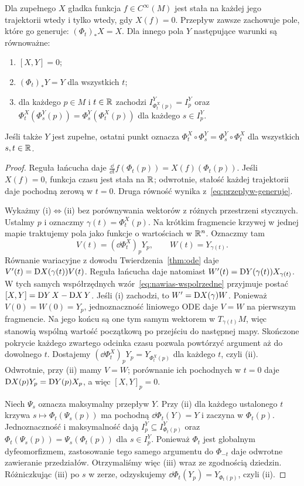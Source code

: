 \begin{stwierdzenie}\label{prop:inwarianty}
Dla zupełnego $X$ gładka funkcja $f\in C^\infty(M)$ jest stała na każdej jego trajektorii
wtedy i tylko wtedy, gdy $X(f)=0$. Przepływ zawsze zachowuje
pole, które go generuje: $(\Phi_t)_*X=X$.
Dla innego pola $Y$ następujące warunki są równoważne:
\begin{enumerate}[label=(\roman*)]
\item $[X,Y]=0$;
\item $(\Phi_t)_*Y=Y$ dla wszystkich $t$;
\item dla każdego $p\in M$ i $t\in\mathbb{R}$ zachodzi
$I^Y_{\Phi_t^X(p)}=I^Y_p$ oraz
$\Phi_t^X(\Phi_s^Y(p))=\Phi_s^Y(\Phi_t^X(p))$
dla każdego $s\in I^Y_p$.
\end{enumerate}
Jeśli także $Y$ jest zupełne, ostatni punkt oznacza
$\Phi_t^X\circ\Phi_s^Y=\Phi_s^Y\circ\Phi_t^X$ dla wszystkich $s,t\in\mathbb{R}$.
\end{stwierdzenie}
\begin{proof}
Reguła łańcucha daje
$\frac{\dd}{\dd t}f(\Phi_t(p))=X(f)(\Phi_t(p))$.
Jeśli $X(f)=0$, funkcja czasu jest stała na $\mathbb{R}$;
odwrotnie, stałość każdej trajektorii daje pochodną zerową w $t=0$.
Druga równość wynika z~\eqref{eq:przeplyw-generuje}.

Wykażmy (i)$\Leftrightarrow$(ii) bez porównywania wektorów
z różnych przestrzeni stycznych. Ustalmy $p$ i oznaczmy
$\gamma(t)=\Phi_t^X(p)$. Na krótkim fragmencie krzywej
w jednej mapie traktujemy pola jako funkcje o wartościach w $\mathbb{R}^n$.
Oznaczmy tam
\[
V(t)=(\dd\Phi_t^X)_pY_p,
\qquad W(t)=Y_{\gamma(t)}.
\]
Równanie wariacyjne z dowodu Twierdzenia~\ref{thm:ode}
daje $V'(t)=\mathrm D X(\gamma(t))V(t)$.
Reguła łańcucha daje natomiast
$W'(t)=\mathrm D Y(\gamma(t))X_{\gamma(t)}$.
W tych samych współrzędnych wzór~\eqref{eq:nawias-wspolrzedne}
przyjmuje postać $[X,Y]=\mathrm D Y\,X-\mathrm D X\,Y$.
Jeśli (i) zachodzi, to $W'=\mathrm D X(\gamma)W$.
Ponieważ $V(0)=W(0)=Y_p$, jednoznaczność liniowego ODE
daje $V=W$ na pierwszym fragmencie. Na jego końcu są one
tym samym wektorem w $T_{\gamma(t)}M$, więc stanowią wspólną
wartość początkową po przejściu do następnej mapy.
Skończone pokrycie każdego zwartego odcinka czasu pozwala
powtórzyć argument aż do dowolnego $t$. Dostajemy
$(\dd\Phi_t^X)_pY_p=Y_{\Phi_t^X(p)}$ dla każdego $t$,
czyli (ii). Odwrotnie, przy (ii) mamy $V=W$;
porównanie ich pochodnych w $t=0$ daje
$\mathrm D X(p)Y_p=\mathrm D Y(p)X_p$, a więc $[X,Y]_p=0$.

Niech $\Psi_s$ oznacza maksymalny przepływ $Y$. Przy (ii)
dla każdego ustalonego $t$ krzywa $s\mapsto\Phi_t(\Psi_s(p))$
ma pochodną $\dd\Phi_t(Y)=Y$ i zaczyna w $\Phi_t(p)$.
Jednoznaczność i maksymalność dają
$I_p^Y\subseteq I_{\Phi_t(p)}^Y$ oraz
$\Phi_t(\Psi_s(p))=\Psi_s(\Phi_t(p))$ dla $s\in I_p^Y$.
Ponieważ $\Phi_t$ jest globalnym dyfeomorfizmem, zastosowanie
tego samego argumentu do $\Phi_{-t}$ daje odwrotne zawieranie
przedziałów. Otrzymaliśmy więc (iii) wraz ze zgodnością dziedzin.
Różniczkując (iii) po $s$ w zerze, odzyskujemy
$\dd\Phi_t(Y_p)=Y_{\Phi_t(p)}$, czyli (ii).
\end{proof}

